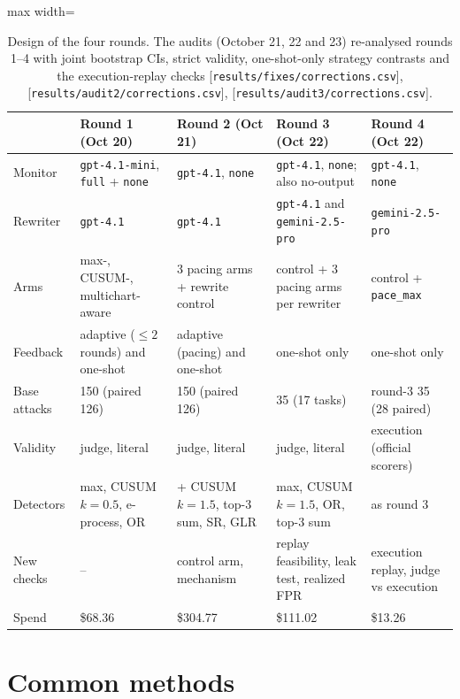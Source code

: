\documentclass[11pt]{article}
\newcommand{\src}[1]{{\footnotesize\textcolor{ink2}{[\nolinkurl{#1}]}}}
\begin{document}
\begin{table}[H]\centering\small
\begin{adjustbox}{max width=\linewidth}
\begin{tabular}{@{}lllll@{}}
\toprule
& Round 1 (Oct 20) & Round 2 (Oct 21) & Round 3 (Oct 22) & Round 4 (Oct 22)\\
\midrule
Monitor & \texttt{gpt-4.1-mini}, \texttt{full} + \texttt{none} & \texttt{gpt-4.1}, \texttt{none} & \texttt{gpt-4.1}, \texttt{none}; also no-output & \texttt{gpt-4.1}, \texttt{none}\\
Rewriter & \texttt{gpt-4.1} & \texttt{gpt-4.1} & \texttt{gpt-4.1} and \texttt{gemini-2.5-pro} & \texttt{gemini-2.5-pro}\\
Arms & max-, CUSUM-, multichart-aware & 3 pacing arms + rewrite control & control + 3 pacing arms per rewriter & control + \texttt{pace\_max}\\
Feedback & adaptive ($\le2$ rounds) and one-shot & adaptive (pacing) and one-shot & one-shot only & one-shot only\\
Base attacks & 150 (paired 126) & 150 (paired 126) & 35 (17 tasks) & round-3 35 (28 paired)\\
Validity & judge, literal & judge, literal & judge, literal & execution (official scorers)\\
Detectors & max, CUSUM $k{=}0.5$, e-process, OR & + CUSUM $k{=}1.5$, top-3 sum, SR, GLR & max, CUSUM $k{=}1.5$, OR, top-3 sum & as round 3\\
New checks & -- & control arm, mechanism & replay feasibility, leak test, realized FPR & execution replay, judge vs execution\\
Spend & \$68.36 & \$304.77 & \$111.02 & \$13.26\\
\bottomrule
\end{tabular}
\end{adjustbox}
\caption{Design of the four rounds. The audits (October 21, 22 and 23) re-analysed rounds 1--4 with joint bootstrap CIs, strict validity, one-shot-only strategy contrasts and the execution-replay checks \src{results/fixes/corrections.csv}, \src{results/audit2/corrections.csv}, \src{results/audit3/corrections.csv}.}\label{tab:rounds}
\end{table}

\section{Common methods}\label{sec:methods}
\end{document}
